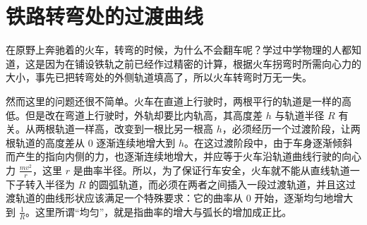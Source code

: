 \section{铁路转弯处的过渡曲线}

在原野上奔驰着的火车，转弯的时候，为什么不会翻车呢？学过中学物理的人都知道，这是因为在铺设铁轨之前已经作过精密的计算，根据火车拐弯时所需向心力的大小，事先已把转弯处的外侧轨道填高了，所以火车转弯时万无一失。

然而这里的问题还很不简单。火车在直道上行驶时，两根平行的轨道是一样的高低。但是改在弯道上行驶时，外轨却要比内轨高，其高度差 $h$ 与轨道半径 $R$ 有关。从两根轨道一样高，改变到一根比另一根高 $h$，必须经历一个过渡阶段，让两根轨道的高度差从 $0$ 逐渐连续地增大到 $h$。在这过渡阶段中，由于车身逐渐倾斜而产生的指向内侧的力，也逐渐连续地增大，并应等于火车沿轨道曲线行驶的向心力 $\frac{mv^2}{r}$，这里 $r$ 是曲率半径。所以，为了保证行车安全，火车就不能从直线轨道一下子转入半径为 $R$ 的圆弧轨道，而必须在两者之间插入一段过渡轨道，并且这过渡轨道的曲线形状应该满足一个特殊要求：它的曲率从 $0$ 开始，逐渐均匀地增大到 $\frac{1}{R}$。这里所谓“均匀”，就是指曲率的增大与弧长的增加成正比。

